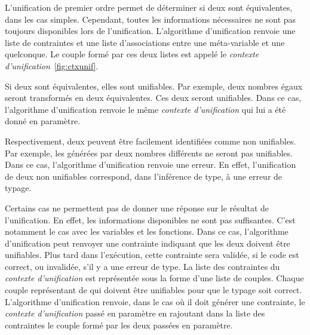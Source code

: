                 L'unification de premier ordre permet de déterminer si deux \lexp{} sont équivalentes, dans les cas simples.
                Cependant, toutes les informations nécessaires ne sont pas toujours disponibles lors de l'unification.
                L'algorithme d'unification renvoie une liste de contraintes et une liste d'associations entre une méta-variable et une \lexp{} quelconque.
                Le couple formé par ces deux listes est appelé le \textit{contexte d'unification}~\ref{fig:ctxunif}.

                Si deux \lexp{} sont équivalentes, elles sont unifiables. Par exemple, deux nombres égaux seront transformés en deux \lexp{} équivalentes.
                Ces deux \lexp{} seront unifiables.
                Dans ce cas, l'algorithme d'unification renvoie le même \textit{contexte d'unification} qui lui a été donné en paramètre.

                Respectivement, deux \lexp{} peuvent être facilement identifiées comme non unifiables. Par exemple, les \lexp{} générées par deux nombres différents
                ne seront pas unifiables.
                Dans ce cas, l'algorithme d'unification renvoie une erreur. En effet, l'unification de deux \lexp{} non unifiables correspond,
                dans l'inférence de type, à une erreur de typage.

                Certains cas ne permettent pas de donner une réponse sur le résultat de l'unification. En effet, les informations disponibles
                ne sont pas suffisantes. C'est notamment le cas avec les variables et les fonctions.
                Dans ce cas, l'algorithme d'unification peut renvoyer une contrainte indiquant que les deux \lexp{} doivent être unifiables.
                Plus tard dans l'exécution, cette contrainte sera validée, si le code est correct, ou invalidée, s'il y a une erreur de type.
                La liste des contraintes du \textit{contexte d'unification} est représentée sous la forme d'une liste de couples.
                Chaque couple représentant de \lexp{} qui doivent être unifiables pour que le typage soit correct.
                L'algorithme d'unification renvoie, dans le cas où il doit générer une contrainte, le \textit{contexte d'unification} passé en paramètre
                en rajoutant dans la liste des contraintes le couple formé par les deux \lexp{} passées en paramètre.

